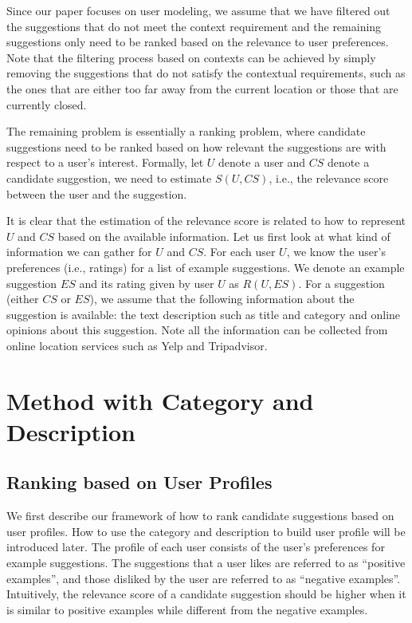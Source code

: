 Since our paper focuses on user modeling, we assume 
that we have filtered out the suggestions that do not meet the context requirement 
and the remaining suggestions
only need to be ranked based on the relevance to 
user preferences. Note that the filtering process 
based on contexts can be achieved by simply removing 
the suggestions that do not satisfy the contextual 
requirements, such as the ones that are either 
too far away from the current location or those 
that are currently closed. 

The remaining problem is essentially a ranking 
problem, where candidate suggestions need to 
be ranked based on how relevant the suggestions
are with respect to a user's interest. 
Formally, let $U$ denote a user and $CS$ denote a 
candidate suggestion, we need to estimate 
$S(U,CS)$, i.e., the relevance score between 
the user and the suggestion. 

It is clear that the estimation of the relevance 
score is related to how to represent $U$ 
and $CS$ based on the available information. 
Let us first look at what kind of 
information we can gather for $U$ and $CS$.  
For each user $U$, 
we know the user's preferences (i.e., ratings) for a list of 
example suggestions. We denote an example suggestion $ES$ 
and its rating given by user $U$ as $R(U,ES)$.  For a 
suggestion (either $CS$ or $ES$), we assume that the 
following information about the suggestion is available: 
the text description such as title and category and online 
opinions about this suggestion. 
Note all the information can be collected from online location 
services such as Yelp and Tripadvisor. 


\section{Method with Category and Description}

\subsection{Ranking based on User Profiles}

We first describe our framework of how to rank candidate suggestions 
based on user profiles. How to use the category and description to build 
user profile will be introduced later. 
The profile of each user consists of the user's 
preferences for example suggestions. The suggestions that a 
user likes are referred to as ``positive examples'', and those
disliked by the user are referred to as ``negative examples''. 
Intuitively, the relevance score of a candidate suggestion should 
be higher when it is similar to positive examples while different
from the negative examples. 

